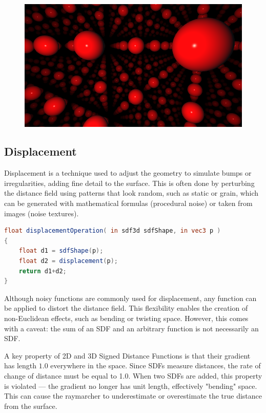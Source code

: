 \begin{figure}[ht]
    \centering
  \includegraphics[width=.6\linewidth]{imagens/domain-repetition.png}
  \label{fig:sdf-3d-domainRepetition}
\end{figure}

\subsection{Displacement}

Displacement is a technique used to adjust the geometry to simulate bumps or irregularities, adding fine detail to the surface. This is often done by perturbing the distance field using patterns that look random, such as static or grain, which can be generated with mathematical formulas (procedural noise) or taken from images (noise textures).

\begin{lstlisting}[language=GLSL, caption={Code 6: SDF Displacement}, label={lst:Displacement} float=H]
float displacementOperation( in sdf3d sdfShape, in vec3 p )
{
    float d1 = sdfShape(p);
    float d2 = displacement(p);
    return d1+d2;
}
\end{lstlisting}

Although noisy functions are commonly used for displacement, any function can be applied to distort the distance field. This flexibility enables the creation of non-Euclidean effects, such as bending or twisting space. However, this comes with a caveat: the sum of an SDF and an arbitrary function is not necessarily an SDF.

A key property of 2D and 3D Signed Distance Functions is that their gradient has length $1.0$ everywhere in the space. Since SDFs measure distances, the rate of change of distance must be equal to 1.0. When two SDFs are added, this property is violated — the gradient no longer has unit length, effectively "bending" space. This can cause the raymarcher to underestimate or overestimate the true distance from the surface.

